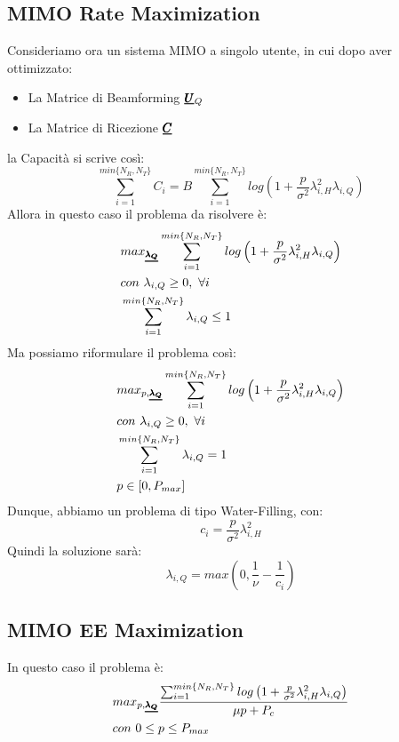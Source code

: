 \subsection{MIMO Rate Maximization}
Consideriamo ora un sistema MIMO a singolo utente, in cui dopo aver ottimizzato:
\begin{itemize}
    \item La Matrice di Beamforming $\pmb{\underline{U}}_Q$
    \item La Matrice di Ricezione $\pmb{\underline{C}}$
\end{itemize}
la Capacità si scrive così:
\begin{equation*}
    \sum_{i=1}^{min\{N_R, N_T\}} C_i = B \sum_{i=1}^{min\{N_R, N_T\}} log\left(1 + \frac{p}{\sigma^2} \lambda_{i,H}^2 \lambda_{i,Q}\right)
\end{equation*}
Allora in questo caso il problema da risolvere è:
\begin{equation*}
    \begin{aligned}
    & max_{\pmb{\underline{\lambda_Q}}}  \sum_{i=1}^{min\{N_R, N_T\}} log\left(1 + \frac{p}{\sigma^2} \lambda_{i,H}^2 \lambda_{i,Q}\right) \\
    & con \ \lambda_{i,Q} \geq 0, \ \forall i \\
    & \sum_{i=1}^{min\{N_R, N_T\}} \lambda_{i,Q} \leq 1
    \end{aligned}
\end{equation*}
Ma possiamo riformulare il problema così:
\begin{equation*}
    \begin{aligned}
    & max_{p,\pmb{\underline{\lambda_Q}}}  \sum_{i=1}^{min\{N_R, N_T\}} log\left(1 + \frac{p}{\sigma^2} \lambda_{i,H}^2 \lambda_{i,Q}\right) \\
    & con \ \lambda_{i,Q} \geq 0, \ \forall i \\
    & \sum_{i=1}^{min\{N_R, N_T\}} \lambda_{i,Q} = 1 \\
    & p \in [0, P_{max}]
    \end{aligned}
\end{equation*}
Dunque, abbiamo un problema di tipo Water-Filling, con:
\begin{equation*}
    c_i = \frac{p}{\sigma^2} \lambda^2_{i, H}
\end{equation*}
Quindi la soluzione sarà:
\begin{equation*}
  \lambda_{i,Q} =  max \left(0, \frac{1}{\nu} - \frac{1}{c_i}\right)
\end{equation*}

\subsection{MIMO EE Maximization}
In questo caso il problema è:
\begin{equation*}
    \begin{aligned}
    & max_{p,\pmb{\underline{\lambda_Q}}} \frac{\sum_{i=1}^{min\{N_R, N_T\}} log\left(1 + \frac{p}{\sigma^2} \lambda_{i,H}^2 \lambda_{i,Q}\right)}{\mu p + P_c}  \\
    & con \ 0 \leq p \leq P_{max}
    \end{aligned}
\end{equation*}

